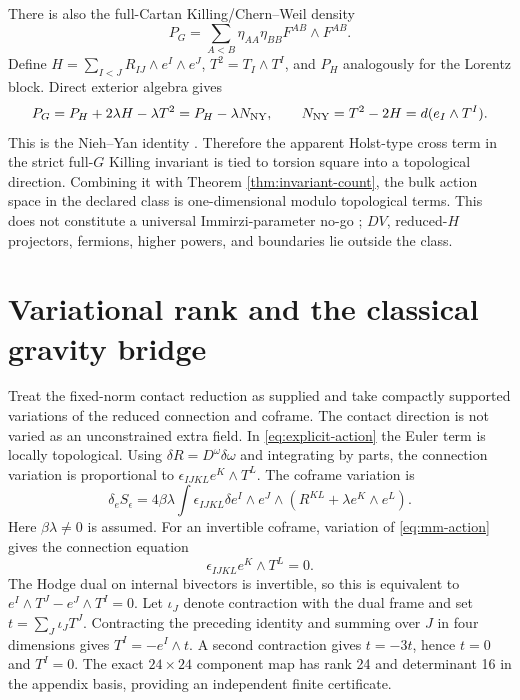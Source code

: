 \documentclass[11pt]{article}
\theoremstyle{remark}\newtheorem{remark}[theorem]{Remark}
\begin{document}
There is also the full-Cartan Killing/Chern--Weil density
\begin{equation}
 P_G=\sum_{A<B}\eta_{AA}\eta_{BB}F^{AB}\wedge F^{AB}.
 \label{eq:chern-weil}
\end{equation}
Define $H=\sum_{I<J}R_{IJ}\wedge e^I\wedge e^J$,
$T^2=T_I\wedge T^I$, and $P_H$ analogously for the Lorentz block.  Direct exterior
algebra gives
\begin{equation}
 P_G=P_H+2\lambda H-\lambda T^2
 =P_H-\lambda N_{\rm NY},\qquad
 N_{\rm NY}=T^2-2H=d(e_I\wedge T^I).
 \label{eq:nieh-yan}
\end{equation}
This is the Nieh--Yan identity \cite{NiehYan}.  Therefore the apparent Holst-type cross
term in the strict full-$G$ Killing invariant is tied to torsion square into a topological
direction.  Combining it with Theorem \ref{thm:invariant-count}, the bulk action space in
the declared class is one-dimensional modulo topological terms.  This does not constitute
a universal Immirzi-parameter no-go \cite{Holst,Immirzi}; $DV$, reduced-$H$ projectors,
fermions, higher powers, and boundaries lie outside the class.

\section{Variational rank and the classical gravity bridge}

Treat the fixed-norm contact reduction as supplied and take compactly supported
variations of the reduced connection and coframe.
The contact direction is not varied as an unconstrained extra field.
In \eqref{eq:explicit-action} the Euler term is locally topological.
Using $\delta R=D^\omega\delta\omega$ and integrating by parts, the
connection variation is proportional to
$\epsilon_{IJKL}e^K\wedge T^L$.
The coframe variation is
\begin{equation}
 \delta_e S_\epsilon
 =4\beta\lambda\int\epsilon_{IJKL}
 \delta e^I\wedge e^J\wedge
 (R^{KL}+\lambda e^K\wedge e^L).
\end{equation}
Here $\beta\lambda\ne0$ is assumed.
For an invertible coframe, variation of \eqref{eq:mm-action} gives the connection equation
\begin{equation}
 \epsilon_{IJKL}e^K\wedge T^L=0.
 \label{eq:torsion-equation}
\end{equation}
The Hodge dual on internal bivectors is invertible, so this is equivalent to
$e^I\wedge T^J-e^J\wedge T^I=0$.
Let $\iota_J$ denote contraction with the dual frame and set
$t=\sum_J\iota_JT^J$.
Contracting the preceding identity and summing over $J$ in four dimensions
gives $T^I=-e^I\wedge t$.
A second contraction gives $t=-3t$, hence $t=0$ and $T^I=0$.
The exact $24\times24$ component map has rank 24 and determinant 16 in the
appendix basis, providing an independent finite certificate.
\end{document}
